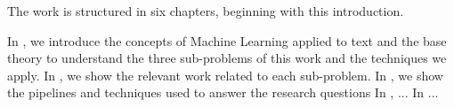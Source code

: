 
The work is structured in six chapters, beginning with this introduction.

In , we introduce the concepts of Machine Learning applied to text and the base theory to understand the three sub-problems of this work and the techniques we apply.
In , we show the relevant  work related to each sub-problem.  In , we show the pipelines and techniques used to answer the research questions In , ...
In ...




    






